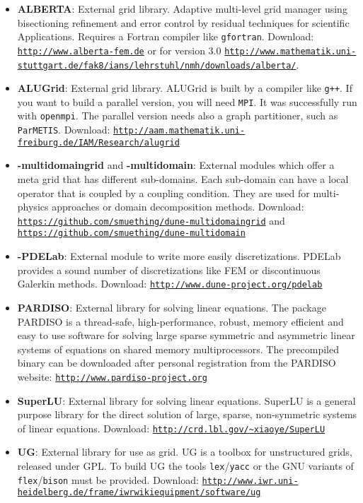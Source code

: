 \begin{itemize}
\item \textbf{ALBERTA}: External grid library. Adaptive multi-level grid manager using bisectioning
  refinement and error control by residual techniques for scientific Applications. Requires a Fortran
  compiler like \texttt{gfortran}. Download: \texttt{\url{http://www.alberta-fem.de}} or for version 3.0
  \texttt{\url{http://www.mathematik.uni-stuttgart.de/fak8/ians/lehrstuhl/nmh/downloads/alberta/}}.

\item \textbf{ALUGrid}: External grid library. ALUGrid is built by a \Cplusplus compiler like \texttt{g++}.
  If you want to build a parallel version, you will need \texttt{MPI}. It was successfully run with \texttt{openmpi}.
  The parallel version needs also a graph partitioner, such as \texttt{ParMETIS}.
  Download: \texttt{\url{http://aam.mathematik.uni-freiburg.de/IAM/Research/alugrid}}

\item \textbf{\Dune-multidomaingrid} and \textbf{\Dune-multidomain}: External modules which offer a meta grid that
  has different sub-domains. Each sub-domain can have a local operator that is coupled by a coupling condition. They are
  used for multi-physics approaches or domain decomposition methods. Download:
  \texttt{\url{https://github.com/smuething/dune-multidomaingrid}}
  and \texttt{\url{https://github.com/smuething/dune-multidomain}}

\item \textbf{\Dune-PDELab}: External module to write more easily discretizations. PDELab provides
  a sound number of discretizations like FEM or discontinuous Galerkin methods.
  Download: \texttt{\url{http://www.dune-project.org/pdelab}}

\item \textbf{PARDISO}: External library for solving linear equations. The package PARDISO is a thread-safe,
  high-performance, robust, memory efficient and easy to use software for solving large sparse symmetric
  and asymmetric linear systems of equations on shared memory multiprocessors. The precompiled binary
  can be downloaded after personal registration from the PARDISO website: \texttt{\url{http://www.pardiso-project.org}}

\item \textbf{SuperLU}: External library for solving linear equations. SuperLU is a general purpose
  library for the direct solution of large, sparse, non-symmetric systems of linear equations.
  Download: \texttt{\url{http://crd.lbl.gov/~xiaoye/SuperLU}}

\item \textbf{UG}: External library for use as grid. UG is a toolbox for unstructured grids, released under GPL.
  To build UG the tools \texttt{lex}/\texttt{yacc} or the GNU variants of \texttt{flex}/\texttt{bison} must be provided.
  Download: \texttt{\url{http://www.iwr.uni-heidelberg.de/frame/iwrwikiequipment/software/ug}}
\end{itemize}

